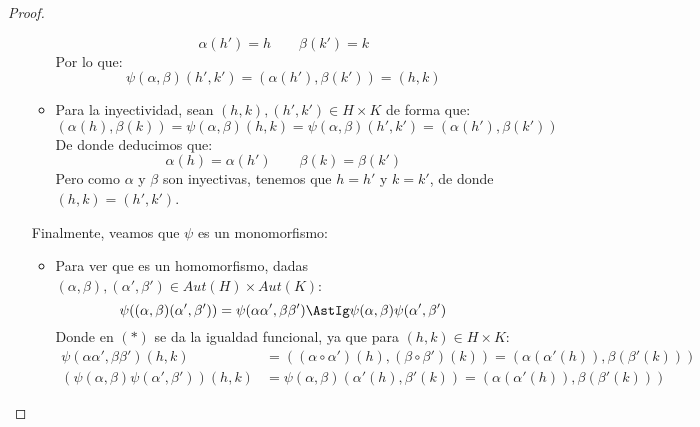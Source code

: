 \begin{prop}
\begin{proof}
\begin{enumerate}
\begin{itemize}
                        \begin{equation*}
                            \alpha(h') = h \qquad 
                            \beta(k') = k
                        \end{equation*}
                        Por lo que:
                        \begin{equation*}
                            \psi(\alpha,\beta)(h',k') = (\alpha(h'),\beta(k')) = (h,k)
                        \end{equation*}
                    \item Para la inyectividad, sean $(h,k),(h',k')\in H\times K$ de forma que:
                        \begin{equation*}
                            (\alpha(h),\beta(k)) = \psi(\alpha,\beta)(h,k) = \psi(\alpha,\beta)(h',k') = (\alpha(h'),\beta(k')) 
                        \end{equation*}
                        De donde deducimos que:
                        \begin{equation*}
                            \alpha(h) = \alpha(h') \qquad \beta(k) = \beta(k')
                        \end{equation*}
                        Pero como $\alpha$ y $\beta$ son inyectivas, tenemos que $h = h'$ y $k = k'$, de donde $(h,k) = (h',k')$.
                \end{itemize}
                Finalmente, veamos que $\psi$ es un monomorfismo:
                \begin{itemize}
                    \item Para ver que es un homomorfismo, dadas ${(\alpha,\beta),(\alpha',\beta')\in Aut(H)\times Aut(K)}$:
                        \begin{equation*}
                            \psi((\alpha,\beta)(\alpha',\beta')) = \psi(\alpha\alpha',\beta\beta') \AstIg \psi(\alpha,\beta)\psi(\alpha',\beta')
                        \end{equation*}
                        Donde en $(\ast)$ se da la igualdad funcional, ya que para $(h,k)\in H\times K$:
                        \begin{align*}
                            \psi(\alpha\alpha',\beta\beta')(h,k) &= ((\alpha\circ\alpha')(h), (\beta\circ\beta')(k)) = (\alpha(\alpha'(h)), \beta(\beta'(k))) \\
                            (\psi(\alpha,\beta)\psi(\alpha',\beta'))(h,k) &= \psi(\alpha,\beta)(\alpha'(h), \beta'(k)) = (\alpha(\alpha'(h)), \beta(\beta'(k)))

\end{align*}
\end{itemize}
\end{enumerate}
\end{proof}
\end{prop}
